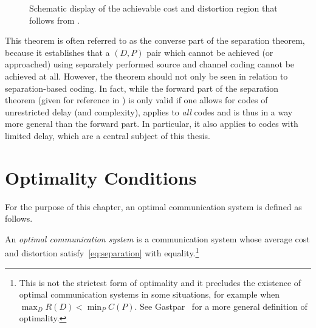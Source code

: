 \begin{figure}
  \begin{center}
  \end{center}
  \caption{Schematic display of the achievable cost and distortion region that
  follows from .}
  \label{fig:achievableregion}
\end{figure}

This theorem is often referred to as the converse part of the separation
theorem, because it establishes that a $(D,P)$ pair which cannot be achieved (or
approached) using separately performed source and channel coding cannot be
achieved at all. However, the theorem should not only be seen in relation to
separation-based coding.  In fact, while the forward part of the
separation theorem (given for reference in ) is only
valid if one allows for codes of unrestricted delay (and complexity),
 applies to \emph{all} codes and is thus in a way
more general than the forward part. In particular, it also applies to codes with
limited delay, which are a central subject of this thesis.


\section{Optimality Conditions}\label{sec:optimality}

For the purpose of this chapter, an optimal communication system is
defined as follows.

\begin{definition}
  \label{def:optimality}
  An \emph{optimal communication system} is a communication system whose
  average cost and distortion satisfy~\eqref{eq:separation} with
  equality.\footnote{This is not the strictest form of
  optimality and it precludes the existence of optimal communication systems in
  some situations, for example when $\max_D R(D) < \min_P C(P)$. See
  Gastpar~\cite{GastparThesis} for a more general  definition of optimality.}
\end{definition}

